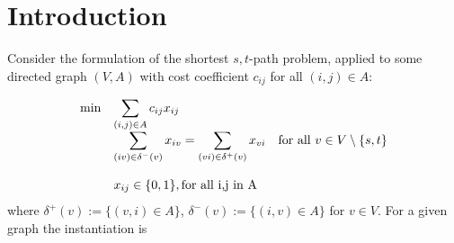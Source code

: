 



\clearpage

\section{Introduction}
Consider the \lpf formulation of the shortest $s,t$-path problem,
applied to some directed graph $(V,A)$ with cost coefficient $c_{ij}$
for all $(i,j) \in A$:

\begin{equation}
  \begin{array}{rll}
    \min& \displaystyle\sum_{(i,j) \in A} c_{ij} x_{ij}\\
    & \displaystyle\sum_{(iv)\in \delta^-(v)} x_{iv} = \sum_{(vi)\in
      \delta^+(v)} x_{vi}
       \mbox{\quad for all }v \in V\setminus\{s,t\} \\
       &  \\
    & x_{ij} \in \{0,1\}, \mbox{for all {i,j} in A}\\
  \end{array}\label{eq:shortestpath}
\end{equation}
%
where $\delta^+(v):=\{(v,i) \in A\}$, $\delta^-(v):=\{(i,v) \in A\}$
for $v\in V$. For a given graph  the instantiation is

